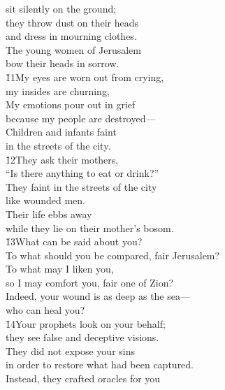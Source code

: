 \begin{poetry}
\poemll    sit silently on the ground; \\
\poeml they throw dust on their heads \\
\poemll    and dress in mourning clothes. \\
\poeml The young women of Jerusalem \\
\poemll    bow their heads in sorrow. \\
\poeml \v{11}My eyes are worn out from crying, \\
\poemll    my insides are churning, \\
\poeml My emotions pour out in grief \\
\poemll    because my people are destroyed--- \\
\poeml Children and infants faint \\
\poemll    in the streets of the city. \\
\poeml \v{12}They ask their mothers, \\
\poemll    ``Is there anything to eat or drink?'' \\
\poeml They faint in the streets of the city \\
\poemll    like wounded men. \\
\poeml Their life ebbs away \\
\poemll    while they lie on their mother's bosom. \\
\poeml \v{13}What can be said about you? \\
\poemll    To what should you be compared, fair Jerusalem? \\
\poeml To what may I liken you, \\
\poemll    so I may comfort you, fair one of Zion? \\
\poeml Indeed, your wound is as deep as the sea--- \\
\poemll    who can heal you? \\
\poeml \v{14}Your prophets look on your behalf; \\
\poemll    they see false and deceptive visions. \\
\poeml They did not expose your sins \\
\poemll    in order to restore what had been captured. \\
\poeml Instead, they crafted oracles for you \\

\end{poetry}
